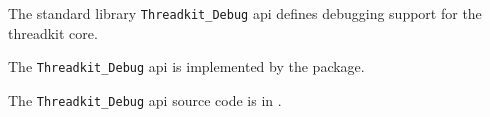 
The standard library {\tt Threadkit\_Debug} api defines debugging support for the threadkit core.

The {\tt Threadkit\_Debug} api is implemented by the  package.

The {\tt Threadkit\_Debug} api source code is in .
